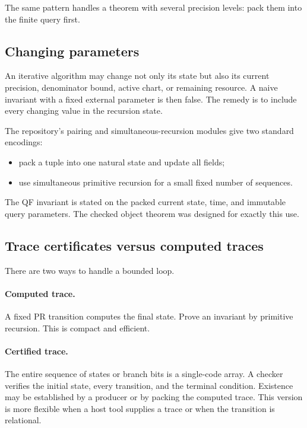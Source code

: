 The same pattern handles a theorem with several precision levels: pack them
into the finite query first.

\subsection{Changing parameters}

An iterative algorithm may change not only its state but also its current
precision, denominator bound, active chart, or remaining resource.  A naive
invariant with a fixed external parameter is then false.  The remedy is to
include every changing value in the recursion state.

The repository's pairing and simultaneous-recursion modules give two standard
encodings:

\begin{itemize}
\item pack a tuple into one natural state and update all fields;
\item use simultaneous primitive recursion for a small fixed number of
sequences.
\end{itemize}

The QF invariant is stated on the packed current state, time, and immutable
query parameters.  The checked object theorem
 was designed for exactly this use.

\subsection{Trace certificates versus computed traces}

There are two ways to handle a bounded loop.

\paragraph{Computed trace.}
A fixed PR transition computes the final state.  Prove an invariant by
primitive recursion.  This is compact and efficient.

\paragraph{Certified trace.}
The entire sequence of states or branch bits is a single-code array.  A checker
verifies the initial state, every transition, and the terminal condition.
Existence may be established by a producer or by packing the computed trace.
This version is more flexible when a host tool supplies a trace or when the
transition is relational.

